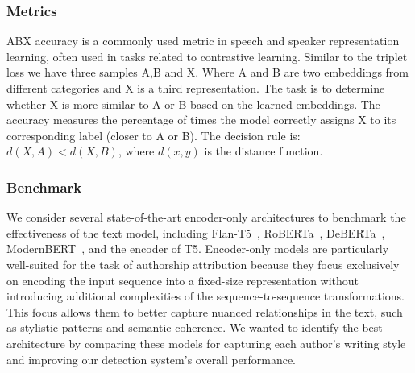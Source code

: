 \documentclass{Interspeech}
\begin{document}
\subsubsection{Metrics}
ABX accuracy is a commonly used metric in speech and speaker representation
learning, often used in tasks related to contrastive learning. Similar to the
triplet loss we have three samples A,B and X. Where A and B are two embeddings
from different categories and X is a third representation. The task is to
determine whether X is more similar to A or B based on the learned embeddings.
The accuracy measures the percentage of times the model correctly assigns X to
its corresponding label (closer to A or B). The decision rule is: $d(X,A) <
  d(X,B)$, where $d(x,y)$ is the distance function. \\
\subsubsection{Benchmark} We consider several state-of-the-art encoder-only architectures to benchmark
the effectiveness of the text model, including Flan-T5~\cite{flan-t5},
RoBERTa~\cite{liu2019roberta}, DeBERTa~\cite{deberta},
ModernBERT~\cite{modernBERT}, and the encoder of T5\cite{t5}. Encoder-only
models are particularly well-suited for the task of authorship attribution
because they focus exclusively on encoding the input sequence into a fixed-size
representation without introducing additional complexities of the
sequence-to-sequence transformations. This focus allows them to better capture
nuanced relationships in the text, such as stylistic patterns and semantic
coherence. We wanted to identify the best architecture by comparing these
models for capturing each author's writing style and improving our detection
system's overall performance.
\end{document}

